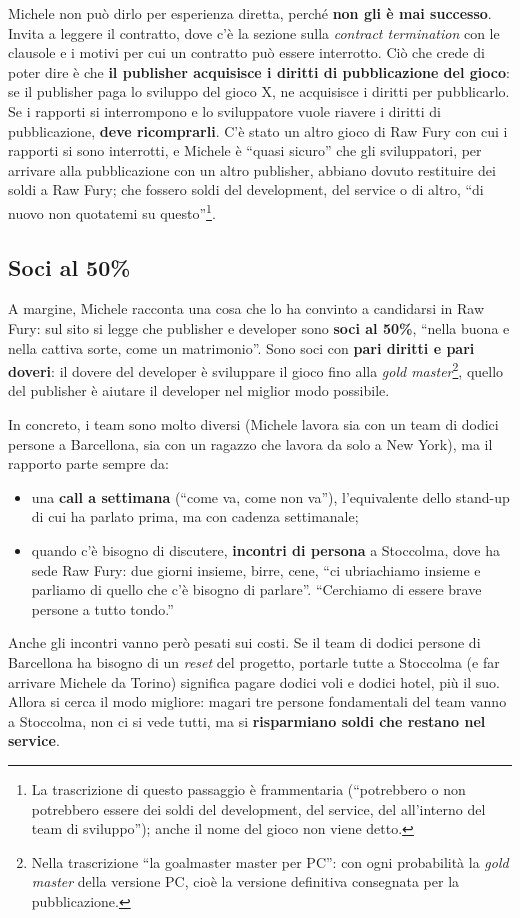 Michele non può dirlo per esperienza diretta, perché \textbf{non gli è mai
successo}. Invita a leggere il contratto, dove c'è la sezione sulla
\emph{contract termination} con le clausole e i motivi per cui un contratto può
essere interrotto. Ciò che crede di poter dire è che \textbf{il publisher
acquisisce i diritti di pubblicazione del gioco}: se il publisher paga lo
sviluppo del gioco X, ne acquisisce i diritti per pubblicarlo. Se i rapporti si
interrompono e lo sviluppatore vuole riavere i diritti di pubblicazione,
\textbf{deve ricomprarli}. C'è stato un altro gioco di Raw Fury con cui i
rapporti si sono interrotti, e Michele è ``quasi sicuro'' che gli sviluppatori,
per arrivare alla pubblicazione con un altro publisher, abbiano dovuto
restituire dei soldi a Raw Fury; che fossero soldi del development, del service
o di altro, ``di nuovo non quotatemi su questo''\footnote{La trascrizione di
questo passaggio è frammentaria (``potrebbero o non potrebbero essere dei soldi
del development, del service, del all'interno del team di sviluppo''); anche
il nome del gioco non viene detto.}.

\subsection{Soci al 50\%}

A margine, Michele racconta una cosa che lo ha convinto a candidarsi in Raw
Fury: sul sito si legge che publisher e developer sono \textbf{soci al 50\%},
``nella buona e nella cattiva sorte, come un matrimonio''. Sono soci con
\textbf{pari diritti e pari doveri}: il dovere del developer è sviluppare il
gioco fino alla \emph{gold master}\footnote{Nella trascrizione ``la goalmaster
master per PC'': con ogni probabilità la \emph{gold master} della versione PC,
cioè la versione definitiva consegnata per la pubblicazione.}, quello del
publisher è aiutare il developer nel miglior modo possibile.

In concreto, i team sono molto diversi (Michele lavora sia con un team di
dodici persone a Barcellona, sia con un ragazzo che lavora da solo a New York),
ma il rapporto parte sempre da:
\begin{itemize}
  \item una \textbf{call a settimana} (``come va, come non va''), l'equivalente
        dello stand-up di cui ha parlato prima, ma con cadenza settimanale;
  \item quando c'è bisogno di discutere, \textbf{incontri di persona} a
        Stoccolma, dove ha sede Raw Fury: due giorni insieme, birre, cene, ``ci
        ubriachiamo insieme e parliamo di quello che c'è bisogno di parlare''.
        ``Cerchiamo di essere brave persone a tutto tondo.''
\end{itemize}
Anche gli incontri vanno però pesati sui costi. Se il team di dodici persone di
Barcellona ha bisogno di un \emph{reset} del progetto, portarle tutte a
Stoccolma (e far arrivare Michele da Torino) significa pagare dodici voli e
dodici hotel, più il suo. Allora si cerca il modo migliore: magari tre persone
fondamentali del team vanno a Stoccolma, non ci si vede tutti, ma si
\textbf{risparmiano soldi che restano nel service}.

